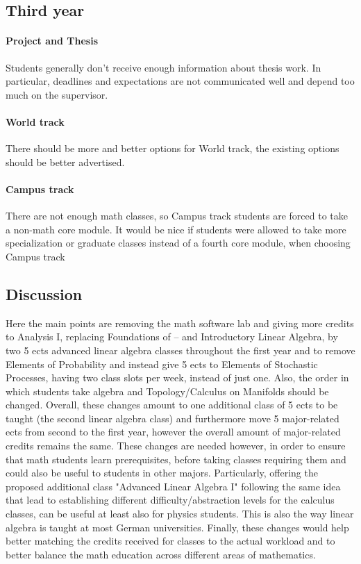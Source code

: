 \subsection{Third year}
\label{sec-3-3}
\paragraph{Project and Thesis} Students generally don't receive enough information about thesis work. 
In particular, deadlines and expectations are not communicated well and depend too much on the supervisor. 
\paragraph{World track} There should be more and better options for World track, the existing options should be better advertised.
\paragraph{Campus track} There are not enough math classes, so Campus track students are forced to take a non-math core module. 
It would be nice if students were allowed to take more specialization or graduate classes instead of a fourth core module, when choosing Campus track


\subsection{Discussion}
\label{sec-3-4}
Here the main points are removing the math software lab and giving more credits to Analysis I, replacing Foundations of -- and Introductory Linear Algebra, by two 5 ects advanced linear algebra classes throughout the first year and to remove Elements of Probability and instead give 5 ects to Elements of Stochastic Processes, having two class slots per week, instead of just one.  
Also, the order in which students take algebra and Topology/Calculus on Manifolds should be changed.
Overall, these changes amount to one additional class of 5 ects to be taught (the second linear algebra class) and
furthermore move 5 major-related ects from second to the first year, however the overall amount of major-related credits remains the same. 
These changes are needed however, in order to ensure that math students learn prerequisites, before taking classes requiring them and could also be useful to students in other majors. 
Particularly, offering the proposed additional class "Advanced Linear Algebra I" following the same idea that lead to establishing different difficulty/abstraction levels for the calculus classes, can be useful at least also for physics students.
This is also the way linear algebra is taught at most German universities.
Finally, these changes would help better matching the credits received for classes to the actual workload and to better balance the math education across different areas of mathematics. 


